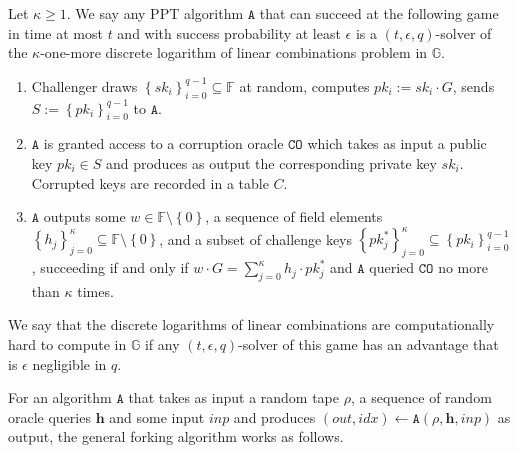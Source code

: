 \documentclass{llncs}
\begin{document}
\begin{definition}\label{def:komdl}

Let $\kappa \geq 1$. We say any PPT algorithm $\texttt{A}$ that can succeed at the following game in time at most $t$ and with success probability at least $\epsilon$ is a $(t, \epsilon, q)$-solver of the $\kappa$-one-more discrete logarithm of linear combinations problem in $\mathbb{G}$.
\begin{enumerate}
\item Challenger draws $\left\{sk_i\right\}_{i=0}^{q-1} \subseteq \mathbb{F}$ at random, computes $pk_i := sk_i \cdot G$, sends $S := \left\{pk_i\right\}_{i=0}^{q-1}$ to $\texttt{A}$.

\item $\texttt{A}$ is granted access to a corruption oracle $\texttt{CO}$ which takes as input a public key $pk_i \in S$ and produces as output the corresponding private key $sk_i$. Corrupted keys are recorded in a table $C$.

\item $\texttt{A}$ outputs some $w \in \mathbb{F}\setminus \left\{0\right\}$, a sequence of field elements $\left\{h_j\right\}_{j=0}^{\kappa} \subseteq \mathbb{F} \setminus \left\{0\right\}$, and a subset of challenge keys $\left\{pk^*_j\right\}_{j=0}^{\kappa} \subseteq \left\{pk_i\right\}_{i=0}^{q-1}$, succeeding if and only if $w \cdot G = \sum_{j=0}^{\kappa} h_j \cdot pk^*_j$ and
 $\texttt{A}$ queried $\texttt{CO}$ no more than $\kappa$ times.

\end{enumerate}
We say that the discrete logarithms of linear combinations are computationally hard to compute in $\mathbb{G}$ if any $(t, \epsilon, q)$-solver of this game has an advantage  that is $\epsilon$ negligible in $q$.
\end{definition}

For an algorithm $\texttt{A}$ that takes as input a random tape $\rho$, a sequence of random oracle queries $\textbf{h}$ and some input $inp$ and produces $(out, idx) \leftarrow \texttt{A}(\rho, \textbf{h}, inp)$ as output, the general forking algorithm works as follows.
\end{document}
